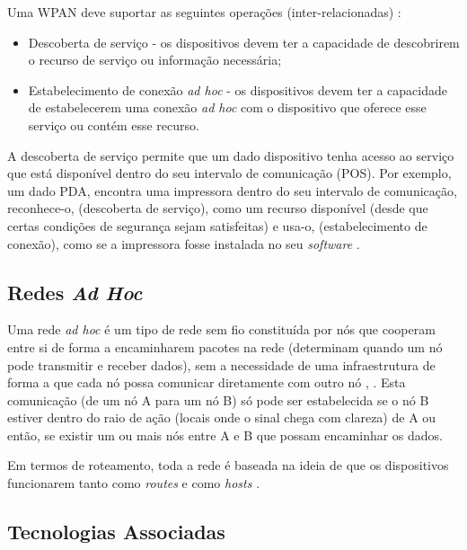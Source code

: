 \documentclass[conference]{IEEEtran}
\begin{document}
Uma WPAN deve suportar as seguintes operações (inter-relacionadas) \cite{prasad2004ofdm}:

\begin{itemize}

 \item Descoberta de serviço - os dispositivos devem ter a capacidade de descobrirem o recurso de serviço ou informação necessária;
 \item Estabelecimento de conexão \textit{ad hoc} - os dispositivos devem ter a capacidade de estabelecerem uma conexão \textit{ad hoc} com o dispositivo que oferece esse serviço ou contém esse recurso.
 
\end{itemize}

A descoberta de serviço permite que um dado dispositivo tenha acesso ao serviço que está disponível dentro do seu intervalo de comunicação (POS).
Por exemplo, um dado PDA, encontra uma impressora dentro do seu intervalo de comunicação, reconhece-o, (descoberta de serviço), como um recurso disponível (desde que certas condições de segurança sejam satisfeitas) e usa-o, (estabelecimento de conexão), como se a impressora fosse instalada no seu \textit{software} \cite{prasad2004ofdm}.

\subsection{Redes \textit{Ad Hoc}} \label{redes_ad_hoc}

Uma rede \textit{ad hoc} é um tipo de rede sem fio constituída por nós que cooperam entre si de forma a encaminharem pacotes na rede (determinam quando um nó pode transmitir e receber dados), sem a necessidade de uma infraestrutura de forma a que cada nó possa comunicar diretamente com outro nó \cite{salonidis2005distributed}, \cite{rubinstein2002qualidade}. 
Esta comunicação (de um nó A para um nó B) só pode ser estabelecida se o nó B estiver dentro do raio de ação (locais onde o sinal chega com clareza) de A ou então, se existir um ou mais nós entre A e B que possam encaminhar os dados.

Em termos de roteamento, toda a rede é baseada na ideia de que os dispositivos funcionarem tanto como \textit{routes} e como \textit{hosts} \cite{prasad2004ofdm}.


\subsection{Tecnologias Associadas}
\end{document}

